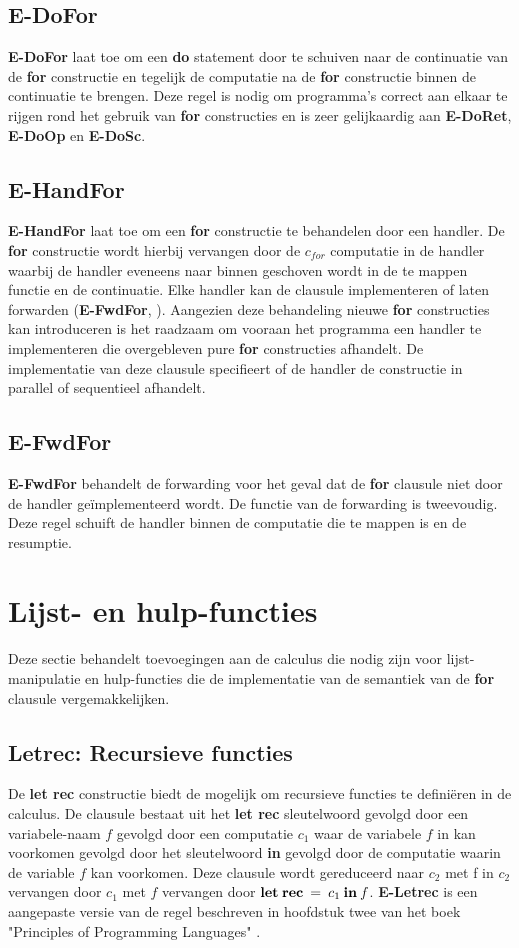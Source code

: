 \subsection{E-DoFor}
\textbf{E-DoFor} laat toe om een \textbf{do} statement door te schuiven naar de continuatie van de \textbf{for} constructie en tegelijk de computatie na de \textbf{for} constructie binnen de continuatie te brengen. Deze regel is nodig om programma's correct aan elkaar te rijgen rond het gebruik van \textbf{for} constructies en is zeer gelijkaardig aan \textbf{E-DoRet}, \textbf{E-DoOp} en \textbf{E-DoSc}.

\subsection{E-HandFor}
\textbf{E-HandFor} laat toe om een \textbf{for} constructie te behandelen door een handler. De \textbf{for} constructie wordt hierbij vervangen door de $c_{for}$ computatie in de handler waarbij de handler eveneens naar binnen geschoven wordt in de te mappen functie en de continuatie. Elke handler kan de clausule implementeren of laten forwarden (\textbf{E-FwdFor}, ). Aangezien deze behandeling nieuwe \textbf{for} constructies kan introduceren is het raadzaam om vooraan het programma een handler te implementeren die overgebleven pure \textbf{for} constructies afhandelt. De implementatie van deze clausule specifieert of de handler de constructie in parallel of sequentieel afhandelt.

\subsection{E-FwdFor} \label{sec:fwdfor}
\textbf{E-FwdFor} behandelt de forwarding voor het geval dat de \textbf{for} clausule niet door de handler geïmplementeerd wordt. De functie van de forwarding is tweevoudig. Deze regel schuift de handler binnen de computatie die te mappen is en de resumptie.

\section{Lijst- en hulp-functies}
Deze sectie behandelt toevoegingen aan de calculus die nodig zijn voor lijst-manipulatie en hulp-functies die de implementatie van de semantiek van de \textbf{for} clausule vergemakkelijken. 
\subsection{Letrec: Recursieve functies}
De \textbf{let rec} constructie biedt de mogelijk om recursieve functies te definiëren in de calculus. De clausule bestaat uit het \textbf{let rec} sleutelwoord gevolgd door een variabele-naam $f$ gevolgd door een computatie $c_{1}$ waar de variabele $f$ in kan voorkomen gevolgd door het sleutelwoord \textbf{in} gevolgd door de computatie waarin de variable $f$ kan voorkomen. Deze clausule wordt gereduceerd naar $c_{2}$ met f in $c_{2}$ vervangen door $c_{1}$ met $f$ vervangen door $\textbf{let\:rec}\:=\:c_{1}\:\textbf{in}\:f$. \textbf{E-Letrec} is een aangepaste versie van de regel beschreven in hoofdstuk twee van het boek "Principles of Programming Languages" \cite{Palmer2009}.
